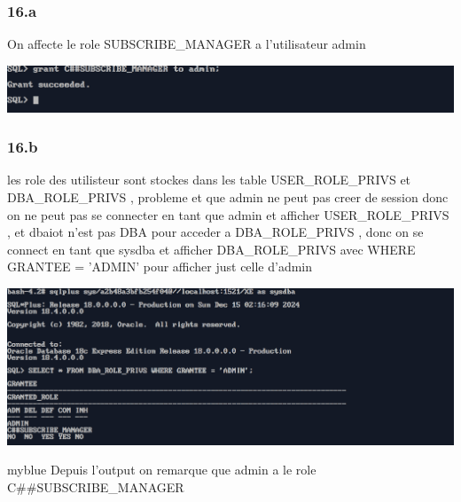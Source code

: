 \subsubsection*{16.a}
On affecte le role SUBSCRIBE\_MANAGER a l'utilisateur admin



\begin{center}
    \includegraphics[width=\textwidth]{ScreenShot/Partie4/grantrole.png}
\end{center}

\subsubsection*{16.b}
les role des utilisteur sont stockes dans les table USER\_ROLE\_PRIVS et DBA\_ROLE\_PRIVS , probleme et que
admin ne peut pas creer de session donc on ne peut pas se connecter en tant que admin et afficher USER\_ROLE\_PRIVS
, et dbaiot n'est pas DBA pour acceder a DBA\_ROLE\_PRIVS , donc on se connect en tant que sysdba et afficher  
DBA\_ROLE\_PRIVS  avec WHERE GRANTEE = 'ADMIN' pour afficher just celle d'admin



\begin{center}
    \includegraphics[width=\textwidth]{ScreenShot/Partie4/verifyrole.png}
\end{center}

\begin{prettyBox}{}{myblue}
Depuis l'output on remarque que admin a le role C\#\#SUBSCRIBE\_MANAGER
\end{prettyBox}


